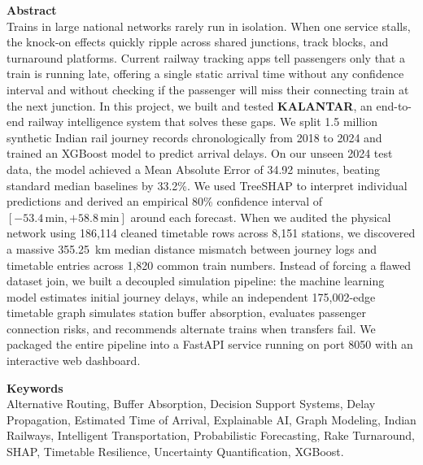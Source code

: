 \documentclass[11pt,a4paper]{article}
\begin{document}
\noindent\textbf{Abstract} \\
Trains in large national networks rarely run in isolation. When one service stalls, the knock-on effects quickly ripple across shared junctions, track blocks, and turnaround platforms. Current railway tracking apps tell passengers only that a train is running late, offering a single static arrival time without any confidence interval and without checking if the passenger will miss their connecting train at the next junction. In this project, we built and tested \textbf{KALANTAR}, an end-to-end railway intelligence system that solves these gaps. We split 1.5 million synthetic Indian rail journey records chronologically from 2018 to 2024 and trained an XGBoost model to predict arrival delays. On our unseen 2024 test data, the model achieved a Mean Absolute Error of 34.92 minutes, beating standard median baselines by 33.2\%. We used TreeSHAP to interpret individual predictions and derived an empirical 80\% confidence interval of $[-53.4\,\mathrm{min}, +58.8\,\mathrm{min}]$ around each forecast. When we audited the physical network using 186,114 cleaned timetable rows across 8,151 stations, we discovered a massive 355.25~km median distance mismatch between journey logs and timetable entries across 1,820 common train numbers. Instead of forcing a flawed dataset join, we built a decoupled simulation pipeline: the machine learning model estimates initial journey delays, while an independent 175,002-edge timetable graph simulates station buffer absorption, evaluates passenger connection risks, and recommends alternate trains when transfers fail. We packaged the entire pipeline into a FastAPI service running on port 8050 with an interactive web dashboard.

\vspace{0.5em}
\noindent\textbf{Keywords} \\
Alternative Routing, Buffer Absorption, Decision Support Systems, Delay Propagation, Estimated Time of Arrival, Explainable AI, Graph Modeling, Indian Railways, Intelligent Transportation, Probabilistic Forecasting, Rake Turnaround, SHAP, Timetable Resilience, Uncertainty Quantification, XGBoost.

\vspace{0.8em}

\end{document}
